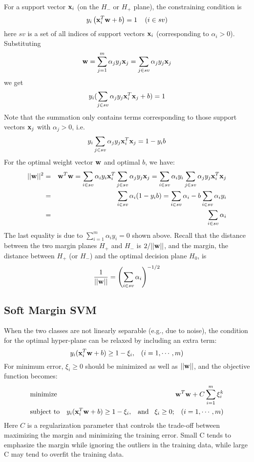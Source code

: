 For a support vector ${\bf x}_i$ (on the $H_-$ or $H_+$ plane), the constraining 
condition is 
\[	y_i \left({\bf x}_i^T {\bf w}+b\right) = 1\;\;\;\;(i \in sv)	\]
here $sv$ is a set of all indices of support vectors ${\bf x}_i$ (corresponding 
to $\alpha_i > 0$). Substituting 
\[	{\bf w}=\sum_{j=1}^m \alpha_j y_j {\bf x}_j=\sum_{j\in sv} \alpha_j y_j {\bf x}_j \]
we get
\[	y_i(\sum_{j\in sv} \alpha_j y_j {\bf x}^T_i {\bf x}_j+b) = 1	\]
Note that the summation only contains terms corresponding to those support 
vectors ${\bf x}_j$ with $\alpha_j>0$, i.e.
\[	y_i \sum_{j\in sv} \alpha_j y_j {\bf x}^T_i {\bf x}_j= 1-y_i b	\]
For the optimal weight vector ${\bf w}$ and optimal $b$, we have:
\begin{eqnarray}
||{\bf w}||^2&=&{\bf w}^T {\bf w}=\sum_{i\in sv} \alpha_i y_i {\bf x}^T_i
	\sum_{j\in sv} \alpha_j y_j {\bf x}_j	=
	\sum_{i\in sv} \alpha_i y_i 
	\sum_{j\in sv} \alpha_j y_j {\bf x}^T_i{\bf x}_j	\nonumber \\
&=&	\sum_{i\in sv} \alpha_i (1-y_i b)
	=\sum_{i\in sv} \alpha_i - b\sum_{i\in sv} \alpha_i y_i	\nonumber \\
&=&	\sum_{i\in sv} \alpha_i \nonumber 
\end{eqnarray}
The last equality is due to $\sum_{i=1}^m \alpha_i y_i=0$ shown above.
Recall that the distance between the two margin planes $H_+$ and $H_-$ is
$2/||{\bf w}||$, and the margin, the distance between $H_+$ (or $H_-$) and the 
optimal decision plane $H_0$, is 
\[	\frac{1}{||{\bf w}||}=\left(\sum_{i\in sv} \alpha_i\right)^{-1/2}	\]

\subsection*{Soft Margin SVM}

When the two classes are not linearly separable (e.g., due to noise), the 
condition for the optimal hyper-plane can be relaxed by including an extra term:
\[	y_i ({\bf x}_i^T{\bf w} +b) \ge 1-\xi_i,\;\;\;(i=1,\cdots,m)	\]
For minimum error, $\xi_i \ge 0$ should be minimized as well as $||{\bf w}||$,
and the objective function becomes:
\begin{eqnarray}
&	\mbox{minimize} & {\bf w}^T {\bf w}+C\sum_{i=1}^m \xi_i^k
	\nonumber \\
&	\mbox{subject to} & y_i ({\bf x}_i^T {\bf w}+b) \ge 1-\xi_i,
	\;\;\;\mbox{and}\;\;\;\xi_i \ge 0;\;\;\;(i=1,\cdots,m)
	\nonumber
\end{eqnarray}
Here $C$ is a regularization parameter that controls the trade-off between 
maximizing the margin and minimizing the training error. Small C tends to 
emphasize the margin while ignoring the outliers in the training data, while
large C may tend to overfit the training data.

